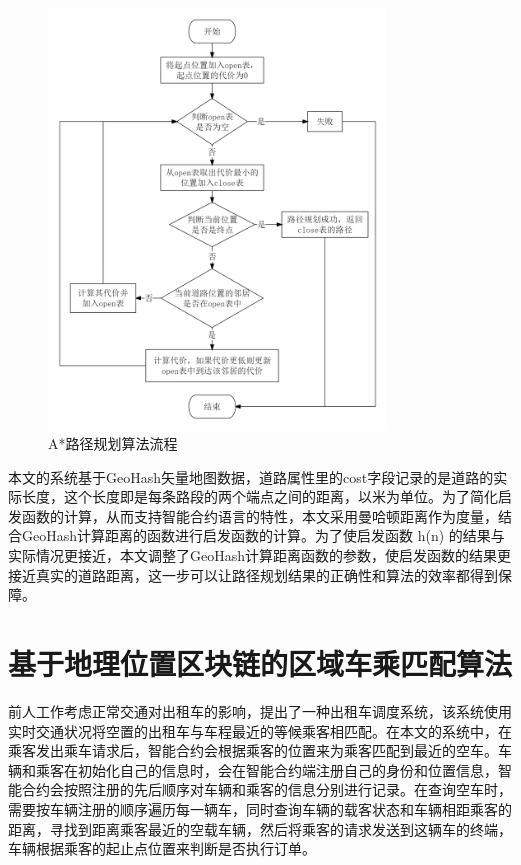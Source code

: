 \begin{figure}[h]
  \centering
  \includegraphics[width=0.8\textwidth]{figures/astar算法流程}
  \caption{A*路径规划算法流程}\label{fig:astar}
\end{figure}

本文的系统基于GeoHash矢量地图数据，道路属性里的cost字段记录的是道路的实际长度，这个长度即是每条路段的两个端点之间的距离，以米为单位。为了简化启发函数的计算，从而支持智能合约语言的特性，本文采用曼哈顿距离作为度量，结合GeoHash计算距离的函数进行启发函数的计算。为了使启发函数 h(n) 的结果与实际情况更接近，本文调整了GeoHash计算距离函数的参数，使启发函数的结果更接近真实的道路距离，这一步可以让路径规划结果的正确性和算法的效率都得到保障。

\section{基于地理位置区块链的区域车乘匹配算法}

前人工作考虑正常交通对出租车的影响，提出了一种出租车调度系统，该系统使用实时交通状况将空置的出租车与车程最近的等候乘客相匹配。在本文的系统中，在乘客发出乘车请求后，智能合约会根据乘客的位置来为乘客匹配到最近的空车。车辆和乘客在初始化自己的信息时，会在智能合约端注册自己的身份和位置信息，智能合约会按照注册的先后顺序对车辆和乘客的信息分别进行记录。在查询空车时，需要按车辆注册的顺序遍历每一辆车，同时查询车辆的载客状态和车辆相距乘客的距离，寻找到距离乘客最近的空载车辆，然后将乘客的请求发送到这辆车的终端，车辆根据乘客的起止点位置来判断是否执行订单。

